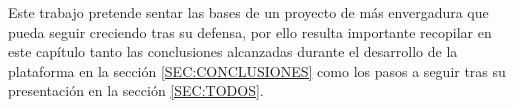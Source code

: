 
Este trabajo pretende sentar las bases de un proyecto de más envergadura que pueda seguir creciendo tras su defensa, por ello resulta importante recopilar en este capítulo tanto las conclusiones alcanzadas durante el desarrollo de la plataforma en la sección \ref{SEC:CONCLUSIONES} como los pasos a seguir tras su presentación en la sección \ref{SEC:TODOS}.
